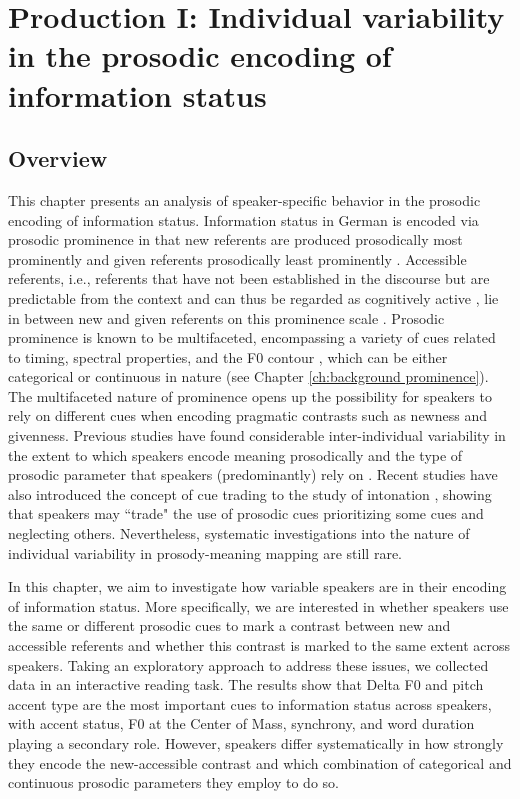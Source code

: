 \chapter{Production I: Individual variability in the prosodic encoding of information status} \label{ch:Production I}

\section{Overview}

This chapter presents an analysis of speaker-specific behavior in the prosodic encoding of information status. Information status in German is encoded via prosodic prominence in that new referents are produced prosodically most prominently and given referents prosodically least prominently \citep[e.g.,][]{baumannCoreferenceLexicalGivenness2013, feryPitchAccentScaling2008}. Accessible referents, i.e., referents that have not been established in the discourse but are predictable from the context and can thus be regarded as cognitively active \citep{chafeDiscourseConsciousnessTime1994}, lie in between new and given referents on this prominence scale \citep{baumannCoreferenceLexicalGivenness2013}. Prosodic prominence is known to be multifaceted, encompassing a variety of cues related to timing, spectral properties, and the F0 contour \citep{roessigTracingPhoneticSpace2022, baumannWhatMakesWord2018}, which can be either categorical or continuous in nature (see Chapter \ref{ch:background prominence}). The multifaceted nature of prominence opens up the possibility for speakers to rely on different cues when encoding pragmatic contrasts such as newness and givenness. Previous studies have found considerable inter-individual variability in the extent to which speakers encode meaning prosodically and the type of prosodic parameter that speakers (predominantly) rely on \citep[e.g.,][]{ouyangIndividualDifferencesProsodic2015, cangemiListenerSpecificPerceptionSpeakerSpecific2015}. Recent studies have also introduced the concept of cue trading to the study of intonation \citep[e.g.,][]{severijnenYourVOORnaamNot2024, arvanitiVariabilityOverlapCue2024}, showing that speakers may ``trade" the use of prosodic cues prioritizing some cues and neglecting others. Nevertheless, systematic investigations into the nature of individual variability in prosody-meaning mapping are still rare.

In this chapter, we aim to investigate how variable speakers are in their encoding of information status. More specifically, we are interested in whether speakers use the same or different prosodic cues to mark a contrast between new and accessible referents and whether this contrast is marked to the same extent across speakers. Taking an exploratory approach to address these issues, we collected data in an interactive reading task. The results show that Delta F0 and pitch accent type are the most important cues to information status across speakers, with accent status, F0 at the Center of Mass, synchrony, and word duration playing a secondary role. However, speakers differ systematically in how strongly they encode the new-accessible contrast and which combination of categorical and continuous prosodic parameters they employ to do so.

